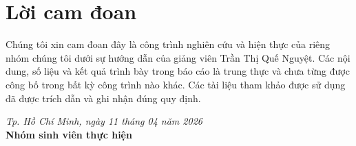 \section*{Lời cam đoan}

Chúng tôi xin cam đoan đây là công trình nghiên cứu và hiện thực của riêng nhóm chúng tôi dưới sự hướng dẫn của giảng viên Trần Thị Quế Nguyệt. Các nội dung, số liệu và kết quả trình bày trong báo cáo là trung thực và chưa từng được công bố trong bất kỳ công trình nào khác. Các tài liệu tham khảo được sử dụng đã được trích dẫn và ghi nhận đúng quy định.

\vspace{1cm}

\begin{flushright}
    \textit{Tp. Hồ Chí Minh, ngày 11 tháng 04 năm 2026} \\
    \textbf{Nhóm sinh viên thực hiện}
\end{flushright}